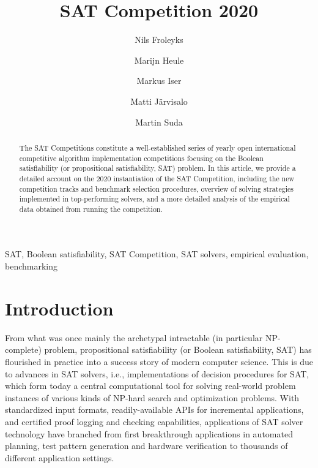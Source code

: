\documentclass{elsarticle}
\title{SAT Competition 2020\tnoteref{title}}
\author[jku]{Nils Froleyks}
\author[cmu]{Marijn Heule}
\author[kit]{Markus Iser}
\author[uh]{Matti J\"arvisalo}
\author[ctu]{Martin Suda}
\begin{document}
\begin{abstract}
The SAT Competitions constitute a well-established series of yearly open international competitive algorithm implementation competitions
focusing on the Boolean satisfiability (or propositional satisfiability, SAT) problem. 
In this article, we provide
a detailed account on the 2020 instantiation of the SAT Competition, including the 
 new competition tracks and benchmark selection procedures, overview of solving strategies implemented in top-performing solvers, 
and a more detailed analysis of the empirical data obtained from running the competition.
\end{abstract}

\begin{keyword}
SAT, Boolean satisfiability, SAT Competition, SAT solvers, empirical evaluation,
benchmarking
\end{keyword}

\maketitle

\section{Introduction}

From what was once mainly the archetypal intractable (in particular NP-complete) problem, propositional satisfiability 
(or Boolean satisfiability, SAT) has flourished in practice into a success story of modern computer science.
This is due to advances in SAT solvers, i.e., implementations of decision procedures for SAT, which form today a 
central computational tool for solving real-world problem instances of various kinds of NP-hard search and optimization problems.
With standardized input formats, readily-available APIs for incremental applications,
and certified proof logging and checking capabilities, applications of SAT solver technology
have branched from first breakthrough applications in automated planning, test pattern generation and hardware verification
to thousands of different application settings. 
\end{document}
